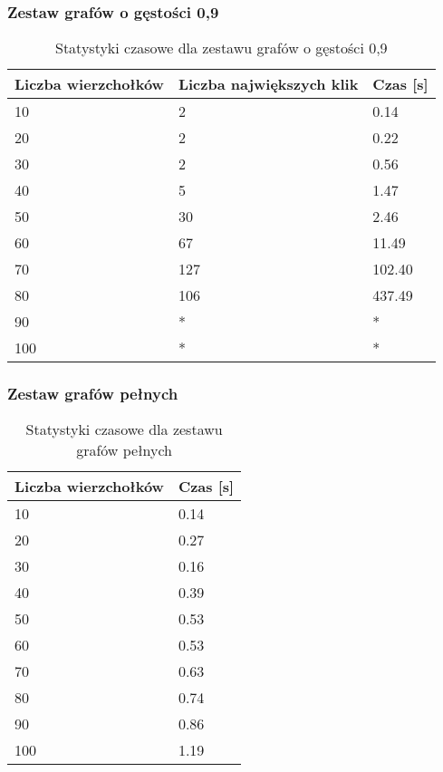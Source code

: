 \documentclass[12pt, a4paper]{article}
\begin{document}
\subsubsection*{Zestaw grafów o gęstości 0,9}
\begin{table}[H]
\caption{Statystyki czasowe dla zestawu grafów o gęstości 0,9}
\begin{center}
    \begin{tabular}{|l|l|l|}
    \hline
    Liczba wierzchołków & Liczba największych klik & Czas [s] \\ \hline
    10 & 2 & 0.14 \\ \hline
    20 & 2 & 0.22 \\ \hline
    30 & 2 & 0.56 \\ \hline
    40 & 5 & 1.47 \\ \hline
    50 & 30 & 2.46 \\ \hline
    60 & 67 & 11.49 \\ \hline
    70 & 127 & 102.40 \\ \hline
    80 & 106 & 437.49 \\ \hline
    90 & * & * \\ \hline
    100 & * & * \\ \hline
    \end{tabular}
\end{center}
\end{table}
\subsubsection*{Zestaw grafów pełnych}
\begin{table}[H]
\caption{Statystyki czasowe dla zestawu grafów pełnych}
\begin{center}
    \begin{tabular}{|l|l|}
    \hline
    Liczba wierzchołków & Czas [s] \\ \hline
    10 & 0.14 \\ \hline
    20 & 0.27 \\ \hline
    30 & 0.16 \\ \hline
    40 & 0.39 \\ \hline
    50 & 0.53 \\ \hline
    60 & 0.53 \\ \hline
    70 & 0.63 \\ \hline
    80 & 0.74 \\ \hline
    90 & 0.86 \\ \hline
    100 & 1.19 \\ \hline
    \end{tabular}
\end{center}
\end{table}
\end{document}
